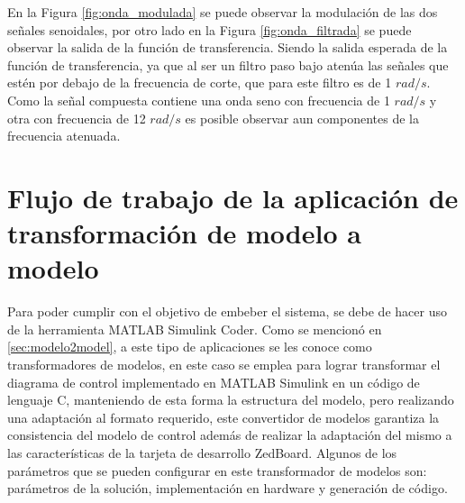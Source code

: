 En la Figura \ref{fig:onda_modulada} se puede observar la modulación de las dos señales senoidales, por otro lado en la Figura \ref{fig:onda_filtrada} se puede observar la salida de la función de transferencia. Siendo la salida esperada de la función de transferencia, ya que al ser un filtro paso bajo atenúa las señales que estén por debajo de la frecuencia de corte, que para este filtro es de 1 $rad/s$. Como la señal compuesta contiene una onda seno con frecuencia de 1 $rad/s$ y otra con frecuencia de 12 $rad/s$ es posible observar aun componentes de la frecuencia atenuada.

\section{Flujo de trabajo de la aplicación de transformación de modelo a modelo}\label{sec:m2m_transformator}

Para poder cumplir con el objetivo de embeber el sistema, se debe de hacer uso de la herramienta MATLAB Simulink Coder. Como se mencionó en \ref{sec:modelo2model}, a este tipo de aplicaciones se les conoce como transformadores de modelos, en este caso se emplea para lograr transformar el diagrama de control implementado en MATLAB Simulink en un código de lenguaje C, manteniendo de esta forma la estructura del modelo, pero realizando una adaptación al formato requerido, este convertidor de modelos garantiza la consistencia del modelo de control además de realizar la adaptación del mismo a las características de la tarjeta de desarrollo ZedBoard. Algunos de los parámetros que se pueden configurar en este transformador de modelos son: parámetros de la solución, implementación en hardware y generación de código.
\newpage

